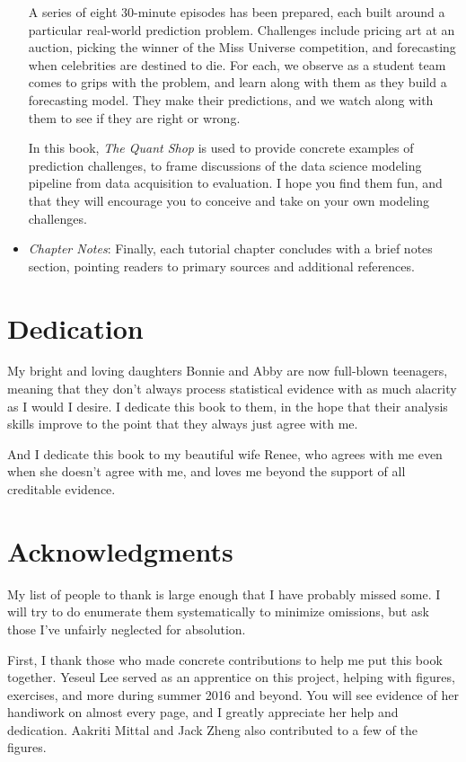 \documentclass[10pt]{article}
\begin{document}
\begin{itemize}
A series of eight 30-minute episodes has been prepared, each built around a particular real-world prediction problem. Challenges include pricing art at an auction, picking the winner of the Miss Universe competition, and forecasting when celebrities are destined to die. For each, we observe as a student team comes to grips with the problem, and learn along with them as they build a forecasting model. They make their predictions, and we watch along with them to see if they are right or wrong.

In this book, \textit{The Quant Shop} is used to provide concrete examples of prediction challenges, to frame discussions of the data science modeling pipeline from data acquisition to evaluation. I hope you find them fun, and that they will encourage you to conceive and take on your own modeling challenges.
  \item \textit{Chapter Notes}: Finally, each tutorial chapter concludes with a brief notes section, pointing readers to primary sources and additional references.
\end{itemize}

\section*{Dedication}
My bright and loving daughters Bonnie and Abby are now full-blown teenagers, meaning that they don't always process statistical evidence with as much alacrity as I would I desire. I dedicate this book to them, in the hope that their analysis skills improve to the point that they always just agree with me.

And I dedicate this book to my beautiful wife Renee, who agrees with me even when she doesn't agree with me, and loves me beyond the support of all creditable evidence.

\section*{Acknowledgments}
My list of people to thank is large enough that I have probably missed some. I will try to do enumerate them systematically to minimize omissions, but ask those I've unfairly neglected for absolution.

First, I thank those who made concrete contributions to help me put this book together. Yeseul Lee served as an apprentice on this project, helping with figures, exercises, and more during summer 2016 and beyond. You will see evidence of her handiwork on almost every page, and I greatly appreciate her help and dedication. Aakriti Mittal and Jack Zheng also contributed to a few of the figures.
\end{document}
